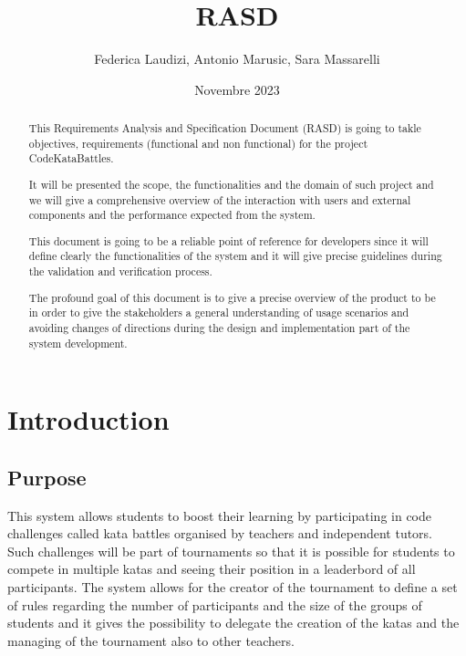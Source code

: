 \documentclass{article}
\title{RASD}
\author{Federica Laudizi, Antonio Marusic, Sara Massarelli}
\date{Novembre 2023}
\begin{document}
\maketitle

\tableofcontents

\begin{abstract}
    This Requirements Analysis and Specification Document (RASD) is going to takle objectives, requirements (functional and non functional) for the project CodeKataBattles.
    
    It will be presented the scope, the functionalities and the domain of such project and we will give a comprehensive overview of the interaction with users and external components and the performance expected from the system.

    This document is going to be a reliable point of reference for developers since it will define clearly the functionalities of the system and it will give precise guidelines during the validation and verification process.

    The profound goal of this document is to give a precise overview of the product to be in order to give the stakeholders a general understanding of usage scenarios and avoiding changes of directions during the design and implementation part of the system development.    
\end{abstract}

\section{Introduction} 
    \subsection{Purpose}
        This system allows students to boost their learning by participating in
        code challenges called kata battles organised by teachers and independent tutors.\\

        Such challenges will be part of tournaments so that it is possible for students to compete in multiple katas and seeing their position in a leaderbord of all participants.
        The system allows for the creator of the tournament to define a set of rules regarding the number of participants and the size of the groups of students and it gives the possibility to delegate the creation of the katas and the managing of the tournament also to other teachers.\\
\end{document}
